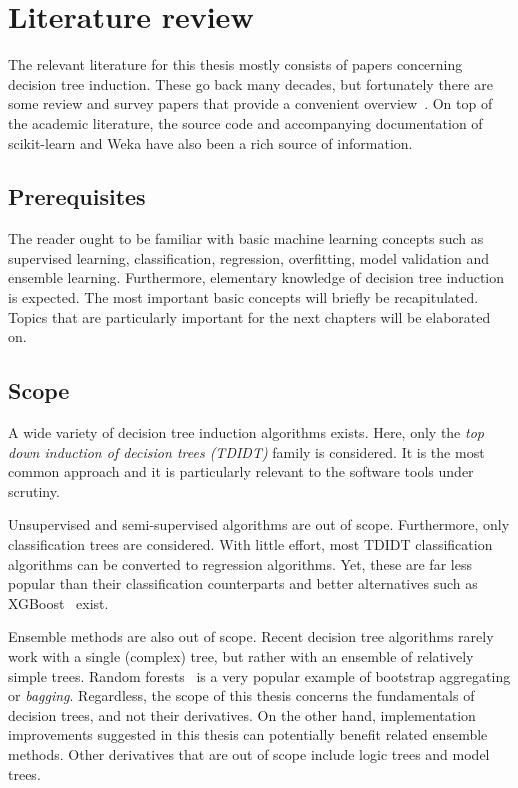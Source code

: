 \chapter{Literature review}\label{cha:literature}
The relevant literature for this thesis mostly consists of papers concerning decision tree induction. These go back many decades, but fortunately there are some review and survey papers that provide a convenient overview~\cite{murthy1998automatic, rokach2005top, kotsiantis2007supervised}. On top of the academic literature, the source code and accompanying documentation of scikit-learn and Weka have also been a rich source of information.

\section{Prerequisites}
The reader ought to be familiar with basic machine learning concepts such as supervised learning, classification, regression, overfitting, model validation and ensemble learning. Furthermore, elementary knowledge of decision tree induction is expected. The most important basic concepts will briefly be recapitulated. Topics that are particularly important for the next chapters will be elaborated on.

\section{Scope}
A wide variety of decision tree induction algorithms exists. Here, only the \emph{top down induction of decision trees (TDIDT)} family is considered. It is the most common approach and it is particularly relevant to the software tools under scrutiny.

Unsupervised and semi-supervised algorithms are out of scope. Furthermore, only classification trees are considered. With little effort, most TDIDT classification algorithms can be converted to regression algorithms. Yet, these are far less popular than their classification counterparts and better alternatives such as XGBoost~\cite{xgboost} exist.

Ensemble methods are also out of scope. Recent decision tree algorithms rarely work with a single (complex) tree, but rather with an ensemble of relatively simple trees. Random forests~\cite{rf} is a very popular example of bootstrap aggregating or \emph{bagging}. Regardless, the scope of this thesis concerns the fundamentals of decision trees, and not their derivatives. On the other hand, implementation improvements suggested in this thesis can potentially benefit related ensemble methods. Other derivatives that are out of scope include logic trees and model trees.

